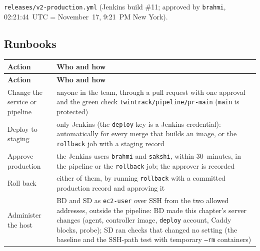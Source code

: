 \begin{longlisting}
\inputminted[fontsize=\scriptsize]{yaml}{config/twintrack/releases/v2-production.yml}
\caption{\texttt{releases/v2-production.yml} (Jenkins build \#11; approved by \texttt{brahmi}, 02:21:44~UTC = November~17, 9:21~PM New York).}
\label{Listing:EDeliveryRecV2P}
\end{longlisting}

\subsection{Runbooks}\label{Section:deliveryRunbooks}
\begin{tabularx}{\linewidth}{L{3.2cm}Y}
\caption{Who may do what\label{Table:DeliveryRights}}\\
\toprule \textbf{Action} & \textbf{Who and how}\\ \midrule
\endfirsthead
\toprule \textbf{Action} & \textbf{Who and how}\\ \midrule
\endhead \bottomrule \endlastfoot
Change the service or pipeline & anyone in the team, through a pull request with one approval and the green check \texttt{twintrack/pipeline/pr-main} (\texttt{main} is protected)\\
Deploy to staging & only Jenkins (the \texttt{deploy} key is a Jenkins credential): automatically for every merge that builds an image, or the \texttt{rollback} job with a staging record\\
Approve production & the Jenkins users \texttt{brahmi} and \texttt{sakshi}, within 30~minutes, in the pipeline or the \texttt{rollback} job; the approver is recorded\\
Roll back & either of them, by running \texttt{rollback} with a committed production record and approving it\\
Administer the host & BD and SD as \texttt{ec2-user} over SSH from the two allowed addresses, outside the pipeline: BD made this chapter's server changes (agent, controller image, \texttt{deploy} account, Caddy blocks, probe); SD ran checks that changed no setting (the baseline and the SSH-path test with temporary \texttt{--rm} containers)\\
\end{tabularx}

